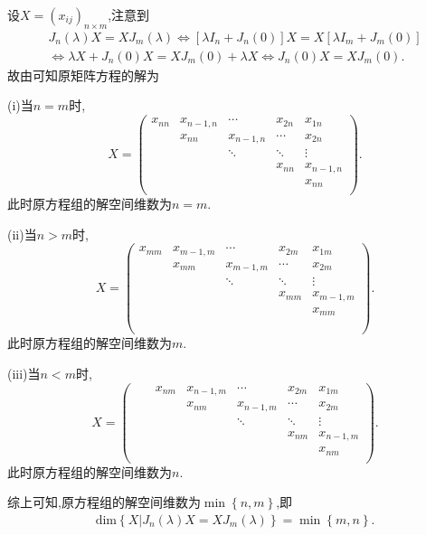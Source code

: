 \documentclass[../../main.tex]{subfiles}%
\begin{document}
\begin{solution}
设$X=(x_{ij})_{n\times m}$,注意到
\begin{gather*}
J_n\left( \lambda \right) X=XJ_m\left( \lambda \right) \Longleftrightarrow \left[ \lambda I_n+J_n\left( 0 \right) \right] X=X\left[ \lambda I_m+J_m\left( 0 \right) \right] 
\\
\Longleftrightarrow \lambda X+J_n\left( 0 \right) X=XJ_m\left( 0 \right) +\lambda X\Longleftrightarrow J_n\left( 0 \right) X=XJ_m\left( 0 \right) .
\end{gather*}
故由可知原矩阵方程的解为

(i)当$n=m$时,
\[
X=\left( \begin{matrix}
x_{nn}&		x_{n-1,n}&		\cdots&		x_{2n}&		x_{1n}\\
&		x_{nn}&		x_{n-1,n}&		\cdots&		x_{2n}\\
&		&		\ddots&		\ddots&		\vdots\\
&		&		&		x_{nn}&		x_{n-1,n}\\
&		&		&		&		x_{nn}\\
\end{matrix} \right) .
\] 
此时原方程组的解空间维数为$n=m$.

(ii)当$n>m$时,
\[
X=\left( \begin{matrix}
x_{mm}&		x_{m-1,m}&		\cdots&		x_{2m}&		x_{1m}\\
&		x_{mm}&		x_{m-1,m}&		\cdots&		x_{2m}\\
&		&		\ddots&		\ddots&		\vdots\\
&		&		&		x_{mm}&		x_{m-1,m}\\
&		&		&		&		x_{mm}\\
&		&		&		&		\\
&		&		&		&		\\
\end{matrix} \right) .
\] 
此时原方程组的解空间维数为$m$.

(iii)当$n<m$时,
\[
X=\left( \begin{matrix}
	&		&		x_{nm}&		x_{n-1,m}&		\cdots&		x_{2m}&		x_{1m}\\
	&		&		&		x_{nm}&		x_{n-1,m}&		\cdots&		x_{2m}\\
	&		&		&		&		\ddots&		\ddots&		\vdots\\
	&		&		&		&		&		x_{nm}&		x_{n-1,m}\\
	&		&		&		&		&		&		x_{nm}\\
\end{matrix} \right) .
\] 
此时原方程组的解空间维数为$n $.

综上可知,原方程组的解空间维数为$\min \left\{ n,m \right\} $,即
\begin{align*}
\mathrm{dim}\left\{ X|J_n\left( \lambda \right) X=XJ_m\left( \lambda \right) \right\} =\min \left\{ m,n \right\}.
\end{align*}

\end{solution}
\end{document}
